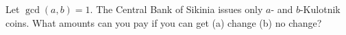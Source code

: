 Let $\gcd(a, b) = 1$. The Central Bank of Sikinia issues only $a$- and $b$-Kulotnik coins. What amounts can you pay if you can get (a) change (b) no change?
